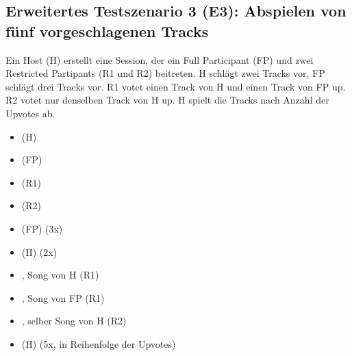 \documentclass[oneside, ngerman]{sdqtechreport}
\begin{document}
\subsection{Erweitertes Testszenario 3 (E3): Abspielen von fünf vorgeschlagenen Tracks}
\label{subsec:Tests:ErweiterteTestszenarien:E3}
Ein Host (H) erstellt eine Session, der ein Full Participant (FP) und zwei Restricted Partipants (R1 und R2) beitreten. H schlägt zwei Tracks vor, FP schlägt drei Tracks vor. R1 votet einen Track von H und einen Track von FP up. R2 votet nur denselben Track von H up. H spielt die Tracks nach Anzahl der Upvotes ab.
\begin{itemize}
    \item \gOne (H)
    \item \gTwo (FP)
    \item \gThree (R1)
    \item \gThree (R2)
    \item \gFour (FP) (3x)
    \item \gFive (H) (2x)
    \item \gSix, Song von H (R1)
    \item \gSix, Song von FP (R1)
    \item \gSeven, selber Song von H (R2)
    \item \gSeven (H) (5x, in Reihenfolge der Upvotes)
\end{itemize}
\end{document}
